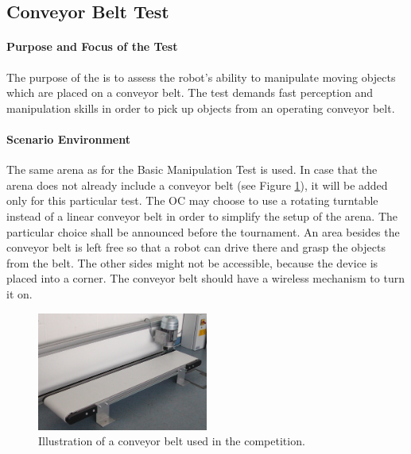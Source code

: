 \newpage
\subsection{Conveyor Belt Test}


\paragraph{Purpose and Focus of the Test}
The purpose of the  is to assess the robot's ability to manipulate moving objects which are placed on a conveyor belt. The test demands fast perception and manipulation skills in order to pick up objects from an operating conveyor belt.

\paragraph{Scenario Environment}
The same arena as for the Basic Manipulation Test is used. In case that the arena does not already include a conveyor belt (see Figure \ref{fig:conveyor_belt}), it will be added only for this particular test.
The OC may choose to use a rotating turntable instead of a linear conveyor belt in order to simplify the setup of the arena. The particular choice shall be announced before the tournament.
An area besides the conveyor belt is left free so that a robot can drive there and grasp the objects from the belt. The other sides might not be accessible, because the device is placed into a corner. 
The conveyor belt should have a wireless mechanism to turn it on. 

\begin{figure} [h!]
\centering
\includegraphics[width=0.5\textwidth ]{../images/conveyor_belt.jpg}
\caption{Illustration of a conveyor belt used in the competition.}
\label{fig:conveyor_belt}
\end{figure}



